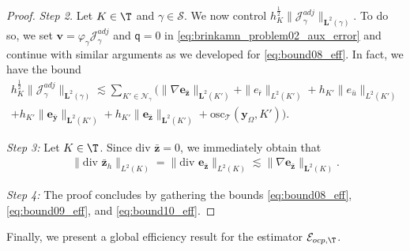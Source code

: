 \documentclass[final]{siamart0216}
\begin{document}
\begin{proof}
\emph{Step 2.} Let $K\in\T$ and $\gamma\in \mathscr{S}$. We now control $h_K^{\frac{1}{2}}\|\mathcal{J}_{\gamma}^{adj}\|_{\mathbf{L}^2(\gamma)}$. To do so, we set $\mathbf{v}=\varphi_{\gamma}\mathcal{J}_{\gamma}^{adj}$ and $\mathsf{q}=0$ in \eqref{eq:brinkamn_problem02_aux_error} and continue with similar arguments as we developed for \eqref{eq:bound08_eff}. In fact, we have the bound
\begin{multline}\label{eq:bound09_eff}
h_{K}^{\frac{1}{2}}\|\mathcal{J}_{\gamma}^{adj}\|_{\mathbf{L}^2(\gamma)}\lesssim \sum_{K'\in \mathcal{N}_{\gamma}} \Big(\|\nabla \mathbf{e}_{\bar{\mathbf{z}}}\|_{\mathbf{L}^2(K')} +\| e_{\bar{\mathsf{r}}} \|_{L^2(K')} +
h_{K'} \|e_{\bar{u}}\|_{L^2(K')}
\\
+
h_{K'}\| \mathbf{e}_{\bar{\mathbf{y}}}\|_{\mathbf{L}^2(K')}
+
h_{K'}\| \mathbf{e}_{\bar{\mathbf{z}}}\|_{\mathbf{L}^2(K')}+\text{osc}_{\mathscr{T}}(\mathbf{y}_{\Omega},K')\Big).
\end{multline}

\emph{Step 3:} Let $K\in \T$. Since $\text{div }\bar{\mathbf{z}}=0$, we immediately obtain that
\begin{align}\label{eq:bound10_eff}
	\|\text{div }\bar{\mathbf{z}}_{h}\|_{L^2(K)}=\|\text{div }\mathbf{e}_{\bar{\mathbf{z}}}\|_{L^2(K)}\lesssim \|\nabla\mathbf{e}_{\bar{\mathbf{z}}}\|_{\mathbf{L}^2(K)}.
\end{align}

\emph{Step 4:} The proof concludes by gathering the bounds \eqref{eq:bound08_eff}, \eqref{eq:bound09_eff}, and \eqref{eq:bound10_eff}.
\end{proof}

Finally, we present a global efficiency result for the estimator $\mathcal{E}_{ocp,\T}$.
\end{document}
